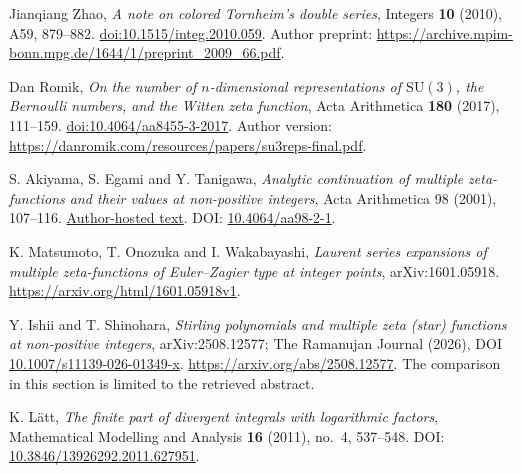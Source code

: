 Jianqiang Zhao, \emph{A note on colored Tornheim's double series},
Integers \textbf{10} (2010), A59, 879--882.
\href{https://doi.org/10.1515/integ.2010.059}{doi:10.1515/integ.2010.059}.
Author preprint:
\url{https://archive.mpim-bonn.mpg.de/1644/1/preprint_2009_66.pdf}.

Dan Romik, \emph{On the number of $n$-dimensional representations of
$\mathrm{SU}(3)$, the Bernoulli numbers, and the Witten zeta function},
Acta Arithmetica \textbf{180} (2017), 111--159.
\href{https://doi.org/10.4064/aa8455-3-2017}{doi:10.4064/aa8455-3-2017}.
Author version:
\url{https://danromik.com/resources/papers/su3reps-final.pdf}.

S. Akiyama, S. Egami and Y. Tanigawa,
\emph{Analytic continuation of multiple zeta-functions and their values
at non-positive integers}, Acta Arithmetica 98 (2001), 107--116.
\href{https://math.tsukuba.ac.jp/~akiyama/papers/Mzffin.pdf}{Author-hosted text}.
DOI: \href{https://doi.org/10.4064/aa98-2-1}{10.4064/aa98-2-1}.

K. Matsumoto, T. Onozuka and I. Wakabayashi,
\emph{Laurent series expansions of multiple zeta-functions of
Euler--Zagier type at integer points}, arXiv:1601.05918.
\url{https://arxiv.org/html/1601.05918v1}.

Y. Ishii and T. Shinohara,
\emph{Stirling polynomials and multiple zeta (star) functions at
non-positive integers}, arXiv:2508.12577; The Ramanujan Journal (2026),
DOI \href{https://doi.org/10.1007/s11139-026-01349-x}{10.1007/s11139-026-01349-x}.
\url{https://arxiv.org/abs/2508.12577}.
The comparison in this section is limited to the retrieved abstract.

K. L\"att, \emph{The finite part of divergent integrals with logarithmic
factors}, Mathematical Modelling and Analysis \textbf{16} (2011), no.~4,
537--548. DOI: \href{https://doi.org/10.3846/13926292.2011.627951}{10.3846/13926292.2011.627951}.

